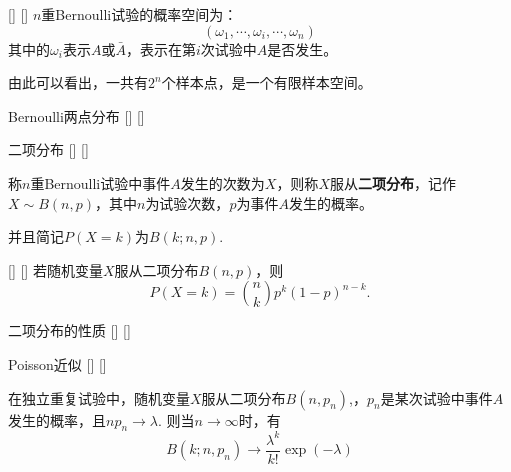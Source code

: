 \documentclass[UTF8]{ctexart}
\begin{document}
        \begin{ppt}
            []
            {}
            []
            []
            $n$重Bernoulli试验的概率空间为：\[(\omega_1,\cdots,\omega_i,\cdots,\omega_n)\]其中的$\omega_i$表示$A$或$\bar{A}$，表示在第$i$次试验中$A$是否发生。

            由此可以看出，一共有$2^n$个样本点，是一个有限样本空间。
        \end{ppt}

        \begin{dfn}
            []
            {Bernoulli两点分布}
            []
            []

        \end{dfn}

        \begin{dfn}
            []
            {二项分布}
            []
            []


            称$n$重Bernoulli试验中事件$A$发生的次数为$X$，则称$X$服从\textbf{二项分布}，记作$X\sim B(n,p)$，其中$n$为试验次数，$p$为事件$A$发生的概率。

            并且简记$P(X=k)$为$B(k;n,p)$.
        \end{dfn}

        \begin{thm}
            []
            {}
            []
            []
            若随机变量$X$服从二项分布$B(n,p)$，则\[P(X=k)=\binom{n}{k}p^k(1-p)^{n-k}.\]
        \end{thm}

        \begin{ppt}
            []
            {二项分布的性质}
            []
            []



        \end{ppt}

        \begin{thm}
            []
            {Poisson近似}
            []
            []


            在独立重复试验中，随机变量$X$服从二项分布$B(n,p_n)$,，$p_n$是某次试验中事件$A$发生的概率，且$np_n\to\lambda $. 则当$n\to\infty$时，有\[B(k;n,p_n)\to\frac{\lambda^k}{k!}\exp (-\lambda) \]
        \end{thm}
\end{document}
